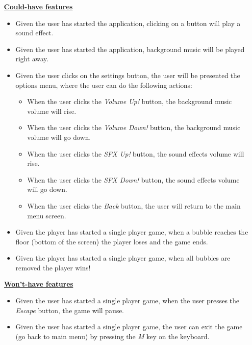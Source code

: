 \documentclass[a4paper,11pt]{article}
\begin{document}
\textbf{\underline{Could-have features}}
\begin{itemize}
  \item Given the user has started the application, clicking on a button will play a sound effect.
  \item Given the user has started the application, background music will be played right away.
  \item Given the user clicks on the settings button, the user will be presented the options menu, where the user can do the following actions:
    \begin{itemize}
    \item When the user clicks the \textit{Volume Up!} button, the background music volume will rise.
    \item When the user clicks the \textit{Volume Down!} button, the background music volume will go down.
    \item When the user clicks the \textit{SFX Up!} button, the sound effects volume will rise.
    \item When the user clicks the \textit{SFX Down!} button, the sound effects volume will go down.
    \item When the user clicks the \textit{Back} button, the user will return to the main menu screen.
    \end{itemize}
   \item Given the player has started a single player game, when a bubble reaches the floor (bottom of the screen) the player loses and the game ends.
   \item Given the player has started a single player game, when all bubbles are removed the player wins! \\
\end{itemize}

\textbf{\underline{Won't-have features}}
\begin{itemize}
   \item Given the user has started a single player game, when the user presses the \textit{Escape} button, the game will pause.
   \item Given the user has started a single player game, the user can exit the game (go back to main menu) by pressing the \textit{M} key on the keyboard.
\end{itemize}

\newpage
\end{document}
